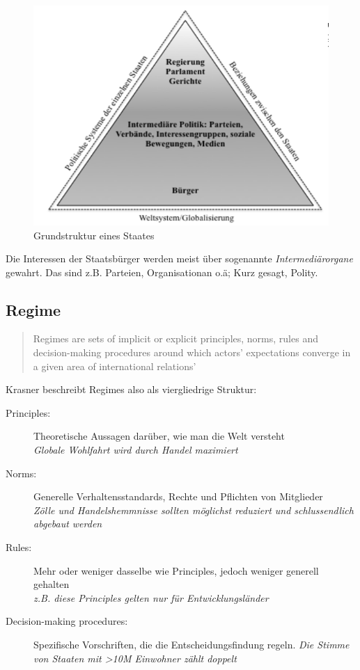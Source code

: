 \documentclass[a4paper, 11pt]{article}
\begin{document}
\begin{figure}[htb]
    \centering
    \includegraphics[keepaspectratio=true,height=10\baselineskip]{analytische_grundstruktur.png}
    \caption{Grundstruktur eines Staates}
    \label{fig:grundstrk_staat}
\end{figure}

Die Interessen der Staatsbürger werden meist über sogenannte \textit{Intermediärorgane} gewahrt. Das sind z.B. Parteien, Organisationan o.ä; Kurz gesagt, Polity.

\subsection{Regime} \label{sec:Regime}
\begin{quote}
    \begin{blockquote}[Krasner 1983]{Regimes are sets of implicit or explicit principles, norms, rules and decision-making procedures around which actors' expectations converge in a given area of international relations'}
    \end{blockquote}
\end{quote}

\noindent Krasner beschreibt Regimes also als viergliedrige Struktur:

\begin{description}
    \item[Principles: ] Theoretische Aussagen darüber, wie man die Welt versteht \\
    \textit{Globale Wohlfahrt wird durch Handel maximiert}
    \item[Norms: ] Generelle Verhaltensstandards, Rechte und Pflichten von Mitglieder \\
    \textit{Zölle und Handelshemmnisse sollten möglichst reduziert und schlussendlich abgebaut werden}
    \item[Rules:] Mehr oder weniger dasselbe wie Principles, jedoch weniger generell gehalten \\
    \textit{z.B. diese Principles gelten nur für Entwicklungsländer}
    \item[Decision-making procedures: ] Spezifische Vorschriften, die die Entscheidungsfindung regeln. 
    \textit{Die Stimme von Staaten mit >10M Einwohner zählt doppelt}
\end{description}
\end{document}
